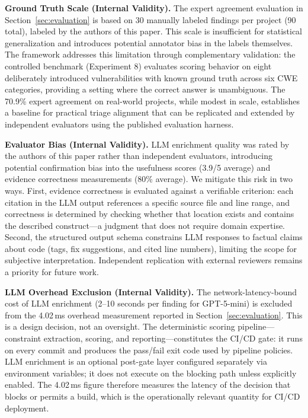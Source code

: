 \textbf{Ground Truth Scale (Internal Validity).}
The expert agreement evaluation in Section~\ref{sec:evaluation} is based on 30 manually labeled findings per project (90 total), labeled by the authors of this paper. This scale is insufficient for statistical generalization and introduces potential annotator bias in the labels themselves. The framework addresses this limitation through complementary validation: the controlled benchmark (Experiment 8) evaluates scoring behavior on eight deliberately introduced vulnerabilities with known ground truth across six CWE categories, providing a setting where the correct answer is unambiguous. The 70.9\% expert agreement on real-world projects, while modest in scale, establishes a baseline for practical triage alignment that can be replicated and extended by independent evaluators using the published evaluation harness.

\textbf{Evaluator Bias (Internal Validity).}
LLM enrichment quality was rated by the authors of this paper rather than independent evaluators, introducing potential confirmation bias into the usefulness scores (3.9/5 average) and evidence correctness measurements (80\% average). We mitigate this risk in two ways. First, evidence correctness is evaluated against a verifiable criterion: each citation in the LLM output references a specific source file and line range, and correctness is determined by checking whether that location exists and contains the described construct---a judgment that does not require domain expertise. Second, the structured output schema constrains LLM responses to factual claims about code (tags, fix suggestions, and cited line numbers), limiting the scope for subjective interpretation. Independent replication with external reviewers remains a priority for future work.

\textbf{LLM Overhead Exclusion (Internal Validity).}
The network-latency-bound cost of LLM enrichment (2--10 seconds per finding for GPT-5-mini) is excluded from the 4.02\,ms overhead measurement reported in Section~\ref{sec:evaluation}. This is a design decision, not an oversight. The deterministic scoring pipeline---constraint extraction, scoring, and reporting---constitutes the CI/CD gate: it runs on every commit and produces the pass/fail exit code used by pipeline policies. LLM enrichment is an optional post-gate layer configured separately via environment variables; it does not execute on the blocking path unless explicitly enabled. The 4.02\,ms figure therefore measures the latency of the decision that blocks or permits a build, which is the operationally relevant quantity for CI/CD deployment.

